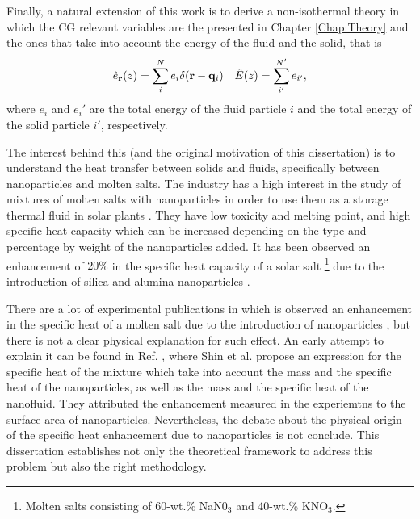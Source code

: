 \documentclass[b5paper,openright,10pt]{book}
\begin{document}

Finally, a natural extension of this work is to derive a non-isothermal theory in which the CG relevant variables are the presented in Chapter \ref{Chap:Theory} and the ones that take into account the energy of the fluid and the solid, that is
\begin{align}
  \hat{e}_{\bf r}(z) = \sum_i^N e_i\delta({\bf r}-{\bf q}_i) &&  \hat{E}(z)=\sum_{i'}^{N'}e_{i'},
\end{align}
where $e_i$ and $e_i'$ are the total energy of the fluid particle $i$ and the total energy of the solid particle $i'$, respectively. 

The interest behind this (and the original motivation of this dissertation) is to understand the heat transfer between solids and fluids, specifically between nanoparticles and molten salts. 
The industry has a high interest in the study of mixtures of molten salts with nanoparticles in order to use them as a storage thermal fluid in solar plants \cite{Mahian2013,Schuller2015b, Shahrul2014a,Goharshadi2013a,Serrano-Lopez2013}. 
They have low toxicity and melting point, and high specific heat capacity which can be increased depending on the type and percentage by weight of the nanoparticles added. 
It has been observed an enhancement of $20\%$  in the specific heat capacity of a solar
salt \footnote{Molten salts consisting of 60-wt.$\%$ NaN0$_3$ and 40-wt.\% KNO$_3$. } due to the introduction of silica and alumina nanoparticles \cite{Chieruzzi2013a}.
  
There are a lot of experimental publications in which is observed an enhancement in the specific heat of a molten salt due to the introduction of nanoparticles \cite{Schuller2015b, Chieruzzi2013a,Khanafer2015a}, but there is not a clear physical explanation for such effect.
An early attempt to explain it can be found in Ref. \cite{Shin2014}, where Shin et al. propose an expression for the specific heat of the mixture which take into account the mass and the specific heat of the nanoparticles, as well as the mass and the specific heat of the nanofluid. They attributed the enhancement measured in the experiemtns to the surface area of nanoparticles. Nevertheless, the debate about the physical origin of the specific heat enhancement due to nanoparticles is not conclude. This dissertation establishes not only the theoretical framework to address this problem but also the right methodology.
\end{document}
